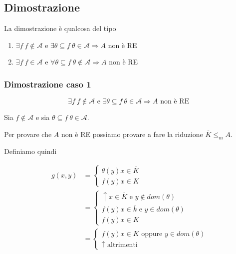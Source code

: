 

\subsection{Dimostrazione}

La dimostrazione è qualcosa del tipo

\begin{enumerate}
	\item $\exists f \: f \notin \mathcal{A} \text{ e } \exists \theta \subseteq f \: \theta \in \mathcal{A} \Rightarrow A$ non è RE
	\item $\exists f \: f \in \mathcal{A} \text{ e } \forall \theta \subseteq f \: \theta \notin \mathcal{A} \Rightarrow A$ non è RE
\end{enumerate}
	
\subsubsection{Dimostrazione caso 1}

 $$
 \exists f \: f \notin \mathcal{A} \text{ e } \exists \theta \subseteq f \: \theta \in \mathcal{A} \Rightarrow A \text{ non è RE }
 $$
 
 Sia $f \notin \mathcal{A}$ e sia $\theta \subseteq f \: \theta \in \mathcal{A}$.
 
 Per provare che $A$ non è RE possiamo provare a fare la riduzione $\overline{K} \leq_m A$. 
 
 Definiamo quindi 
 
\begin{align*}
 g(x,y) &= \begin{cases}
 \theta(y) x \in \overline{K} \\
 f(y) x \in K
 \end{cases} \\
  &= \begin{cases}
 \uparrow x \in \overline{K} \text{ e } y \notin dom(\theta)\\
 f(y) x \in \overline{k} \text{ e } y \in dom(\theta) \\
 f(y) x \in K
 \end{cases} \\
 &=\begin{cases}
  f(y) x \in K \text{ oppure } y \in dom(\theta) \\
  \uparrow \text{ altrimenti}
 \end{cases}
 \end{align*}
 
